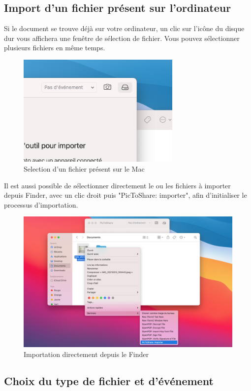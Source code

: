 \documentclass[a4paper,11pt]{article}
\begin{document}
	\subsection{Import d'un fichier présent sur l'ordinateur}

	Si le document se trouve déjà sur votre ordinateur, un clic sur l'icône du disque dur vous affichera une fenêtre de sélection de fichier. Vous pouvez sélectionner plusieurs fichiers en même temps.
		\begin{figure}[h]
			\centering
			\includegraphics[width=8cm]{DD_import}
			\caption{Selection d'un fichier présent sur le Mac}
		\end{figure}

	Il est aussi possible de sélectionner directement le ou les fichiers à importer depuis Finder, avec un clic droit puis "PicToShare: importer", afin d'initialiser le processus d'importation.

	\begin{figure}[h]
		\centering
		\includegraphics[width=13cm]{Right_click_shortcut}
		\caption{Importation directement depuis le Finder}
	\end{figure}

	\subsection{Choix du type de fichier et d'événement}
\end{document}
